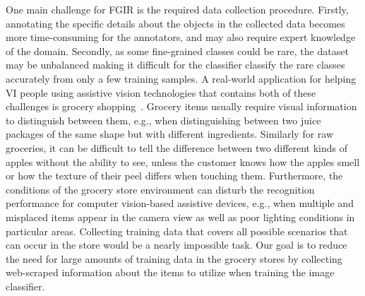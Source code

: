 One main challenge for FGIR is the required data collection procedure. Firstly, annotating the specific details about the objects in the collected data becomes more time-consuming for the annotators, and may also require expert knowledge of the domain.  
Secondly, as some fine-grained classes could be rare, the dataset may be unbalanced making it difficult for the classifier classify the rare classes accurately from only a few training samples. 
A real-world application for helping VI people using assistive vision technologies that contains both of these challenges is grocery shopping~\cite{jafri2014computer,lanigan2006trinetra,winlock2010toward,sosa2017hands,boldu2020aisee,zientara2017third,george2015fine}. Grocery items usually require visual information to distinguish between them, e.g., when distinguishing between two juice packages of the same shape but with different ingredients. Similarly for raw groceries, it can be difficult to tell the difference between two different kinds of apples without the ability to see, unless the customer knows how the apples smell or how the texture of their peel differs when touching them. Furthermore, the conditions of the grocery store environment can disturb the recognition performance for computer vision-based assistive devices, e.g., when multiple and misplaced items appear in the camera view as well as poor lighting conditions in particular areas. Collecting training data that covers all possible scenarios that can occur in the store would be a nearly impossible task. Our goal is to reduce the need for large amounts of training data in the grocery stores by collecting web-scraped information about the items to utilize when training the image classifier. 

